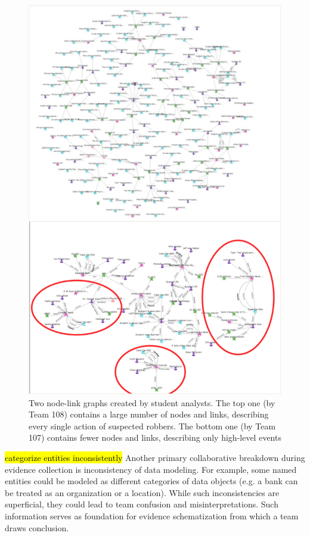 \begin{figure}
\centering
\includegraphics[width=0.7\linewidth]{img/network_example}
\caption{Two node-link graphs created by student analysts. The top one (by Team 108) contains a large number of nodes and links, describing every single action of suspected robbers. The bottom one (by Team 107) contains fewer nodes and links, describing only high-level events}
\label{fig:network_example}
\end{figure}

\hl{categorize entities inconsistently}
Another primary collaborative breakdown during evidence collection is inconsistency of data modeling. For example, some named entities could be modeled as different categories of data objects (e.g. a bank can be treated as an organization or a location). While such inconsistencies are superficial, they could lead to team confusion and misinterpretations. Such information serves as foundation for evidence schematization from which a team draws conclusion. 

